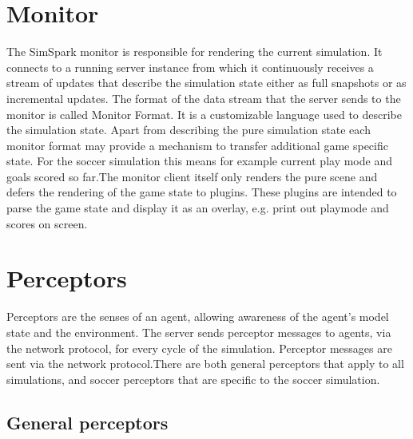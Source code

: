 \section{Monitor}
The SimSpark monitor is responsible for rendering the current simulation. It connects to a running server instance from which it continuously receives a stream of updates that describe the simulation state either as full snapshots or as incremental updates.
The format of the data stream that the server sends to the monitor is called Monitor Format. It is a customizable language used to describe the simulation state.
Apart from describing the pure simulation state each monitor format may provide a mechanism to transfer additional game specific state. For the soccer simulation this means for example current play mode and goals scored so far.The monitor client itself only renders the pure scene and defers the rendering of the game state to plugins. These plugins are intended to parse the game state and display it as an overlay, e.g. print out playmode and scores on screen.
\section{Perceptors}
Perceptors are the senses of an agent, allowing awareness of the agent's model state and the environment.
The server sends perceptor messages to agents, via the network protocol, for every cycle of the simulation.
Perceptor messages are sent via the network protocol.There are both general perceptors that apply to all simulations, and soccer perceptors that are specific to the soccer simulation.



\subsection{General perceptors}


